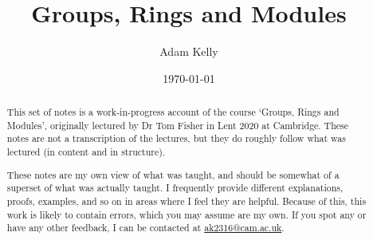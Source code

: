\documentclass[a4paper]{scrreprt}
\title{Groups, Rings and Modules}
\author{Adam Kelly}
\date{\today}
\begin{document}
\maketitle

\newcommand{\newchapter}{\section}
\newcommand{\newsection}{\subsection}
\newcommand{\newsubsection}{\subsubsection}
\newcommand{\newsubsubsection}{\subsubsubsection}

\begin{abstract}
	

	This set of notes is a work-in-progress account of the course `Groups, Rings and Modules', originally lectured by Dr Tom Fisher in Lent 2020 at Cambridge. These notes are not a transcription of the lectures, but they do roughly follow what was lectured (in content and in structure).

	These notes are my own view of what was taught, and should be somewhat of a superset of what was actually taught. I frequently provide different explanations, proofs, examples, and so on in areas where I feel they are helpful. Because of this, this work is likely to contain errors, which you may assume are my own. If you spot any or have any other feedback, I can be contacted at \href{mailto:ak2316@cam.ac.uk}{ak2316@cam.ac.uk}.



\end{abstract}
\end{document}
